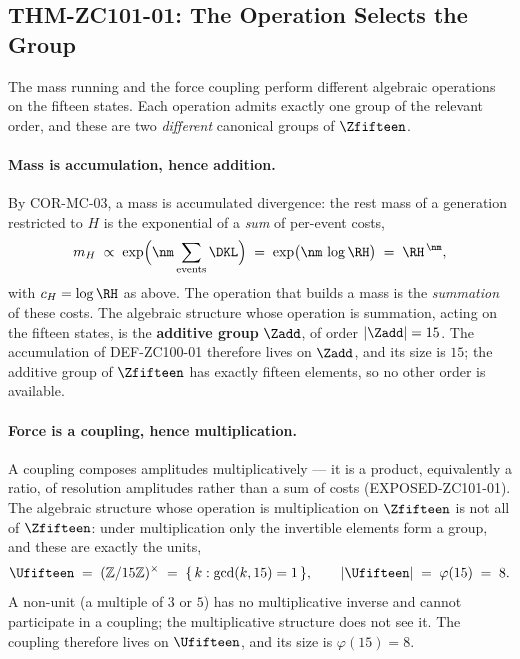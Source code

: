 \documentclass[12pt, a4paper]{article}
\begin{document}

\subsection{THM-ZC101-01: The Operation Selects the Group}
\label{sec:opgroup-zc101}
The mass running and the force coupling perform different algebraic operations
on the fifteen states. Each operation admits exactly one group of the relevant
order, and these are two \emph{different} canonical groups of $\Zfifteen$.

\paragraph{Mass is accumulation, hence addition.}
By COR-MC-03, a mass is accumulated divergence: the rest mass of a generation
restricted to $H$ is the exponential of a \emph{sum} of per-event costs,
\begin{equation}
  m_H \;\propto\; \exp\!\Big(\nm \sum_{\text{events}} \DKL\Big)
            \;=\; \exp\!\big(\nm\,\log\RH\big) \;=\; \RH^{\,\nm},
\end{equation}
with $c_H=\log\RH$ as above. The operation that builds a mass is the
\emph{summation} of these costs. The algebraic structure whose operation is
summation, acting on the fifteen states, is the \textbf{additive group}
$\Zadd$, of order $|\Zadd|=15$. The accumulation of DEF-ZC100-01 therefore lives
on $\Zadd$, and its size is $15$; the additive group of $\Zfifteen$ has exactly
fifteen elements, so no other order is available.

\paragraph{Force is a coupling, hence multiplication.}
A coupling composes amplitudes multiplicatively --- it is a product, equivalently
a ratio, of resolution amplitudes rather than a sum of costs
(EXPOSED-ZC101-01). The algebraic structure whose operation is multiplication on
$\Zfifteen$ is not all of $\Zfifteen$: under multiplication only the invertible
elements form a group, and these are exactly the units,
\begin{equation}
  \Ufifteen \;=\; (\mathbb{Z}/15\mathbb{Z})^{\times}
            \;=\; \{\,k : \gcd(k,15)=1\,\},
  \qquad |\Ufifteen| \;=\; \varphi(15) \;=\; 8.
\end{equation}
A non-unit (a multiple of $3$ or $5$) has no multiplicative inverse and cannot
participate in a coupling; the multiplicative structure does not see it. The
coupling therefore lives on $\Ufifteen$, and its size is $\varphi(15)=8$.
\end{document}
